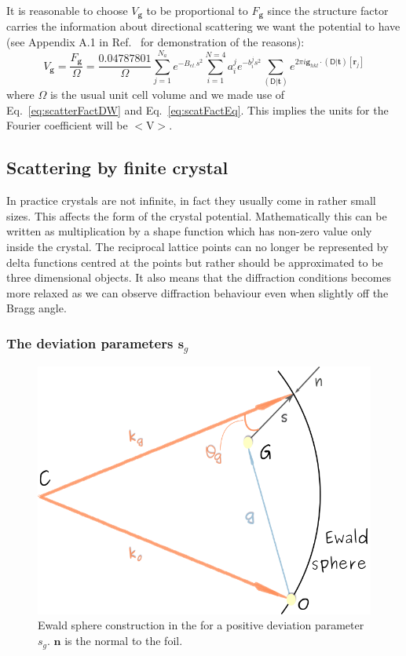It is reasonable to choose $V_\mathbf{g}$ to be proportional to $F_\mathbf{g}$ since the structure factor carries the information about directional scattering we want the potential to have (see Appendix A.1 in Ref.~\cite{Rymer70} for demonstration of the reasons):
\begin{equation}
\label{eq:Vg}
    V_\mathbf{g} = \frac{F_\mathbf{g}}{\Omega} = \frac{0.04787801}{\Omega} \sum_{j=1}^{N_a}  e^{-B_{el.} s^2} \sum_{i=1}^{N=4} a^j_i e^{-b^j_i s^2}    \sum_{(\mathsf{D}|\mathbf{t})} e^{2\pi i  \mathbf{g}_{hkl} \cdot (\mathsf{D}|\mathbf{t})[\mathbf{r}_j] }
\end{equation}
 where $\Omega$ is the usual unit cell volume and we made use of Eq.~\ref{eq:scatterFactDW} and Eq.~\ref{eq:scatFactEq}. This implies the units for the Fourier coefficient will be $<$\si{\volt}$>$.
 
% 
\subsection{Scattering by finite crystal}

In practice crystals are not infinite, in fact they usually come in rather small sizes. This affects the form of the crystal potential. Mathematically this can be written as multiplication by a shape function which has non-zero value only inside the crystal. The reciprocal lattice points can no longer be represented by delta functions centred at the points but rather should be approximated to be three dimensional objects.  It also means that the diffraction conditions becomes more relaxed as we can observe diffraction behaviour even when slightly off the Bragg angle.


\subsubsection{The deviation parameters \texorpdfstring{$\mathbf{s}_g$}{sg}}
\label{sec:sg}

\begin{figure}[ht]
    \centering
\includegraphics[width=0.52\linewidth]{Figures/EwaldSpheresg.png}
\caption{Ewald sphere construction in the for a positive deviation parameter $s_g$. $\mathbf{n}$ is the normal to the foil. }
\label{Fig:Ewaldsg}
\end{figure}

